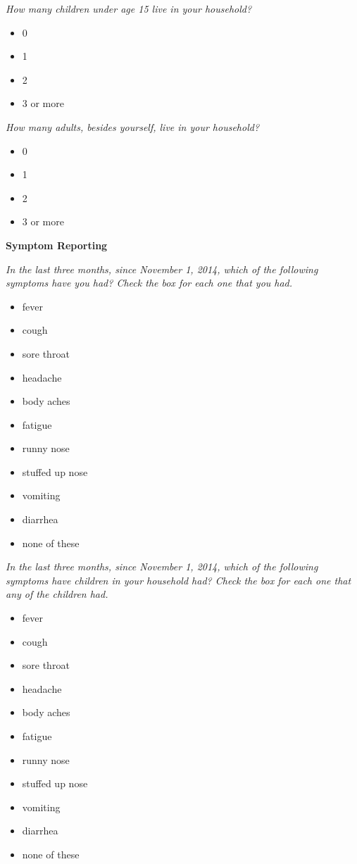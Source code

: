 \documentclass[12pt]{article}
\begin{document}
\emph{How many children under age 15 live in your household?}
\begin{itemize}
\item 0
\item 1
\item 2
\item 3 or more
\end{itemize}

\emph{How many adults, besides yourself, live in your household?}
\begin{itemize}
\item 0
\item 1
\item 2
\item 3 or more
\end{itemize}

\textbf{Symptom Reporting}

\emph{In the last three months, since November 1, 2014, which of the following symptoms have you had? Check the box for each one that you had.}
\begin{itemize}
\item fever
\item cough
\item sore throat
\item headache
\item body aches
\item fatigue
\item runny nose
\item stuffed up nose
\item vomiting
\item diarrhea
\item none of these
\end{itemize}


\emph{In the last three months, since November 1, 2014, which of the following symptoms have children in your household had? Check the box for each one that any of the children had.}
\begin{itemize}
\item fever
\item cough
\item sore throat
\item headache
\item body aches
\item fatigue
\item runny nose
\item stuffed up nose
\item vomiting
\item diarrhea
\item none of these
\end{itemize}
\end{document}
